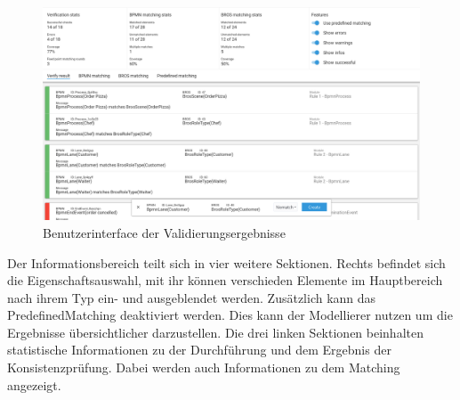 \begin{figure}
    \centering
    \includegraphics[width=\textwidth,keepaspectratio]{../images/Screenshot-Result.png}%
    \caption{Benutzerinterface der Validierungsergebnisse}%
    \label{fig:screenshot-result}
\end{figure}

Der Informationsbereich teilt sich in vier weitere Sektionen.
Rechts befindet sich die Eigenschaftsauswahl, mit ihr können verschieden Elemente im Hauptbereich nach ihrem Typ ein- und ausgeblendet werden.
Zusätzlich kann das PredefinedMatching deaktiviert werden.
Dies kann der Modellierer nutzen um die Ergebnisse übersichtlicher darzustellen.
Die drei linken Sektionen beinhalten statistische Informationen zu der Durchführung und dem Ergebnis der Konsistenzprüfung.
Dabei werden auch Informationen zu dem Matching angezeigt.

